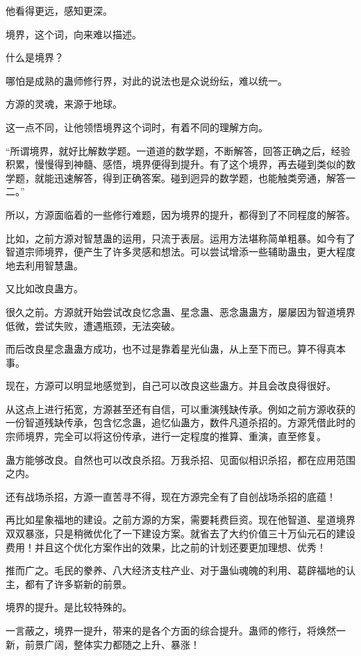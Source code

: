 \begin{this_body}
他看得更远，感知更深。

境界，这个词，向来难以描述。

什么是境界？

哪怕是成熟的蛊师修行界，对此的说法也是众说纷纭，难以统一。

方源的灵魂，来源于地球。

这一点不同，让他领悟境界这个词时，有着不同的理解方向。

“所谓境界，就好比解数学题。一道道的数学题，不断解答，回答正确之后，经验积累，慢慢得到神髓、感悟，境界便得到提升。有了这个境界，再去碰到类似的数学题，就能迅速解答，得到正确答案。碰到迥异的数学题，也能触类旁通，解答一二。”

所以，方源面临着的一些修行难题，因为境界的提升，都得到了不同程度的解答。

比如，之前方源对智慧蛊的运用，只流于表层。运用方法堪称简单粗暴。如今有了智道宗师境界，便产生了许多灵感和想法。可以尝试增添一些辅助蛊虫，更大程度地去利用智慧蛊。

又比如改良蛊方。

很久之前。方源就开始尝试改良忆念蛊、星念蛊、恶念蛊蛊方，屡屡因为智道境界低微，尝试失败，遭遇瓶颈，无法突破。

而后改良星念蛊蛊方成功，也不过是靠着星光仙蛊，从上至下而已。算不得真本事。

现在，方源可以明显地感觉到，自己可以改良这些蛊方。并且会改良得很好。

从这点上进行拓宽，方源甚至还有自信，可以重演残缺传承。例如之前方源收获的一份智道残缺传承，包含忆念蛊，追忆仙蛊方，数件凡道杀招的。方源凭借此时的宗师境界，完全可以将这份传承，进行一定程度的推算、重演，直至修复。

蛊方能够改良。自然也可以改良杀招。万我杀招、见面似相识杀招，都在应用范围之内。

还有战场杀招，方源一直苦寻不得，现在方源完全有了自创战场杀招的底蕴！

再比如星象福地的建设。之前方源的方案，需要耗费巨资。现在他智道、星道境界双双暴涨，只是稍微优化了一下建设方案。就省去了大约价值三十万仙元石的建设费用！并且这个优化方案作出的效果，比之前的计划还要更加理想、优秀！

推而广之。毛民的豢养、八大经济支柱产业、对于蛊仙魂魄的利用、葛辟福地的认主，都有了许多崭新的前景。

境界的提升。是比较特殊的。

一言蔽之，境界一提升，带来的是各个方面的综合提升。蛊师的修行，将焕然一新，前景广阔，整体实力都随之上升、暴涨！


\end{this_body}
